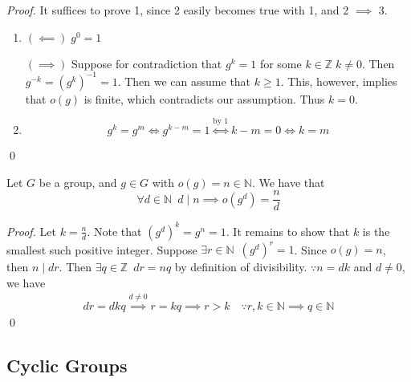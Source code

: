 \documentclass[notoc,notitlepage]{tufte-book}
\begin{document}
\begin{proof}
  It suffices to prove 1, since 2 easily becomes true with 1, and 2 $\implies$ 3.

  \begin{enumerate}
    \item $(\impliedby) \; g^0 = 1$

      $(\implies)$ Suppose for contradiction that $g^k = 1$ for some $k \in \mathbb{Z} \; k \neq 0$. Then $g^{-k} = (g^k)^{-1} = 1$. Then we can assume that $k \geq 1$. This, however, implies that $o(g)$ is finite, which contradicts our assumption. Thus $k = 0$.

    \item \begin{equation*}
      g^k = g^m \iff g^{k - m} = 1 \overset{\text{by } 1}{\iff} k - m = 0 \iff k = m
    \end{equation*}
  \end{enumerate} \qed
\end{proof}

\begin{propo}
\label{propo:orders_of_powers_of_the_element}
  Let $G$ be a group, and $g \in G$ with $o(g) = n \in \mathbb{N}$. We have that
  \begin{equation*}
    \forall d \in \mathbb{N} \enspace d \; | \; n \implies o(g^d) = \frac{n}{d}
  \end{equation*}
\end{propo}

\begin{proof}
  Let $k = \frac{n}{d}$. Note that $(g^d)^k = g^n = 1$. It remains to show that $k$ is the smallest such positive integer. Suppose $\exists r \in \mathbb{N} \enspace (g^d)^r = 1$. Since $o(g) = n$, then $n \; | \; dr$. Then $\exists q \in \mathbb{Z} \enspace dr = nq$ by definition of divisibility. $\because n = dk$ and $d \neq 0$, we have
  \begin{align*}
    dr = dkq \overset{d \neq 0}{\implies} r = kq \implies r > k \quad \because r, k \in \mathbb{N} \implies q \in \mathbb{N}
  \end{align*}\qed
\end{proof}


\subsection{Cyclic Groups}%
\label{sub:cyclic_groups}
\end{document}
